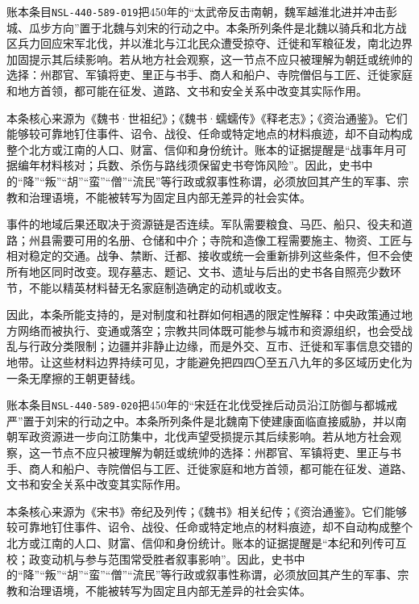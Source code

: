 账本条目\texttt{NSL-440-589-019}把450年的“太武帝反击南朝，魏军越淮北进并冲击彭城、瓜步方向”置于北魏与刘宋的行动之中。本条所列条件是北魏以骑兵和北方战区兵力回应宋军北伐，并以淮北与江北民众遭受掠夺、迁徙和军粮征发，南北边界加固提示其后续影响。若从地方社会观察，这一节点不应只被理解为朝廷或统帅的选择：州郡官、军镇将吏、里正与书手、商人和船户、寺院僧侣与工匠、迁徙家庭和地方首领，都可能在征发、道路、文书和安全关系中改变其实际作用。

本条核心来源为《魏书·世祖纪》；《魏书·蠕蠕传》《释老志》；《资治通鉴》。它们能够较可靠地钉住事件、诏令、战役、任命或特定地点的材料痕迹，却不自动构成整个北方或江南的人口、财富、信仰和身份统计。账本的证据提醒是“战事年月可据编年材料核对；兵数、杀伤与路线须保留史书夸饰风险”。因此，史书中的“降”“叛”“胡”“蛮”“僧”“流民”等行政或叙事性称谓，必须放回其产生的军事、宗教和治理语境，不能被转写为固定且内部无差异的社会实体。

事件的地域后果还取决于资源链是否连续。军队需要粮食、马匹、船只、役夫和道路；州县需要可用的名册、仓储和中介；寺院和造像工程需要施主、物资、工匠与相对稳定的交通。战争、禁断、迁都、接收或统一会重新排列这些条件，但不会使所有地区同时改变。现存墓志、题记、文书、遗址与后出的史书各自照亮少数环节，不能以精英材料替无名家庭制造确定的动机或收支。

因此，本条所能支持的，是对制度和社群如何相遇的限定性解释：中央政策通过地方网络而被执行、变通或落空；宗教共同体既可能参与城市和资源组织，也会受战乱与行政分类限制；边疆并非静止边缘，而是外交、互市、迁徙和军事信息交错的地带。让这些材料边界持续可见，才能避免把四四〇至五八九年的多区域历史化为一条无摩擦的王朝更替线。

账本条目\texttt{NSL-440-589-020}把450年的“宋廷在北伐受挫后动员沿江防御与都城戒严”置于刘宋的行动之中。本条所列条件是北魏南下使建康面临直接威胁，并以南朝军政资源进一步向江防集中，北伐声望受损提示其后续影响。若从地方社会观察，这一节点不应只被理解为朝廷或统帅的选择：州郡官、军镇将吏、里正与书手、商人和船户、寺院僧侣与工匠、迁徙家庭和地方首领，都可能在征发、道路、文书和安全关系中改变其实际作用。

本条核心来源为《宋书》帝纪及列传；《魏书》相关纪传；《资治通鉴》。它们能够较可靠地钉住事件、诏令、战役、任命或特定地点的材料痕迹，却不自动构成整个北方或江南的人口、财富、信仰和身份统计。账本的证据提醒是“本纪和列传可互校；政变动机与参与范围常受胜者叙事影响”。因此，史书中的“降”“叛”“胡”“蛮”“僧”“流民”等行政或叙事性称谓，必须放回其产生的军事、宗教和治理语境，不能被转写为固定且内部无差异的社会实体。

